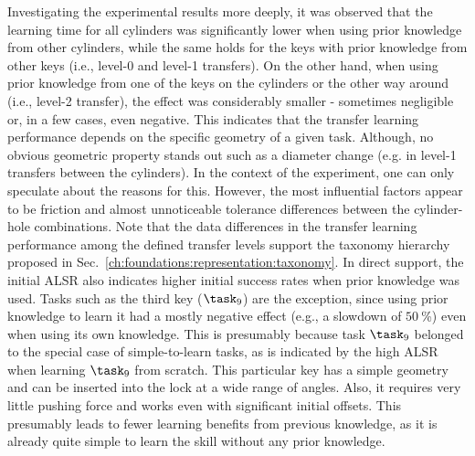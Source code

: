 Investigating the experimental results more deeply, it was observed that the learning time for all cylinders was significantly lower when using prior knowledge from other cylinders, while the same holds for the keys with prior knowledge from other keys (i.e., level-0 and level-1 transfers).
On the other hand, when using prior knowledge from one of the keys on the cylinders or the other way around (i.e., level-2 transfer), the effect was considerably smaller - sometimes negligible or, in a few cases, even negative.
This indicates that the transfer learning performance depends on the specific geometry of a given task.
Although, no obvious geometric property stands out such as a diameter change (e.g. in level-1 transfers between the cylinders).
In the context of the experiment, one can only speculate about the reasons for this.
However, the most influential factors appear to be friction and almost unnoticeable tolerance differences between the cylinder-hole combinations.
Note that the data differences in the transfer learning performance among the defined transfer levels support the taxonomy hierarchy proposed in Sec.~\ref{ch:foundations:representation:taxonomy}.
In direct support, the initial ALSR also indicates higher initial success rates when prior knowledge was used.
Tasks such as the third key ($\task_9$) are the exception, since using prior knowledge to learn it had a mostly negative effect (e.g., a slowdown of $50~$\%) even when using its own knowledge.
This is presumably because task $\task_9$ belonged to the special case of simple-to-learn tasks, as is indicated by the high ALSR when learning $\task_9$ from scratch.
This particular key has a simple geometry and can be inserted into the lock at a wide range of angles.
Also, it requires very little pushing force and works even with significant initial offsets.
This presumably leads to fewer learning benefits from previous knowledge, as it is already quite simple to learn the skill without any prior knowledge.